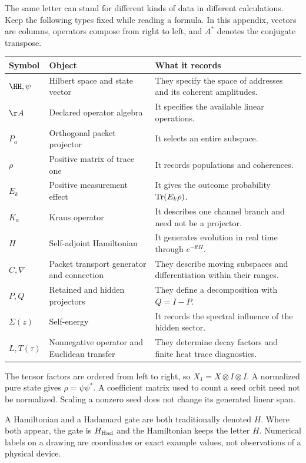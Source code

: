 The same letter can stand for different kinds of data in different calculations. Keep the following types fixed while reading a formula. In this appendix, vectors are columns, operators compose from right to left, and $A^*$ denotes the conjugate transpose.
\par\vspace{4pt}
\begin{tabularx}{\linewidth}{@{}p{.13\linewidth}YY@{}}
\toprule
Symbol & Object & What it records\\\midrule
$\HH,\psi$ & Hilbert space and state vector & They specify the space of addresses and its coherent amplitudes.\\
$\AA$ & Declared operator algebra & It specifies the available linear operations.\\
$P_a$ & Orthogonal packet projector & It selects an entire subspace.\\
$\rho$ & Positive matrix of trace one & It records populations and coherences.\\
$E_k$ & Positive measurement effect & It gives the outcome probability $\operatorname{Tr}(E_k\rho)$.\\
$K_a$ & Kraus operator & It describes one channel branch and need not be a projector.\\
$H$ & Self-adjoint Hamiltonian & It generates evolution in real time through $e^{-\ii tH}$.\\
$C,\nabla$ & Packet transport generator and connection & They describe moving subspaces and differentiation within their ranges.\\
$P,Q$ & Retained and hidden projectors & They define a decomposition with $Q=I-P$.\\
$\Sigma(z)$ & Self-energy & It records the spectral influence of the hidden sector.\\
$L,T(\tau)$ & Nonnegative operator and Euclidean transfer & They determine decay factors and finite heat trace diagnostics.\\\bottomrule
\end{tabularx}
The tensor factors are ordered from left to right, so $X_1=X\otimes I\otimes I$. A normalized pure state gives $\rho=\psi\psi^*$. A coefficient matrix used to count a seed orbit need not be normalized. Scaling a nonzero seed does not change its generated linear span.

A Hamiltonian and a Hadamard gate are both traditionally denoted $H$. Where both appear, the gate is $H_{\rm Had}$ and the Hamiltonian keeps the letter $H$. Numerical labels on a drawing are coordinates or exact example values, not observations of a physical device.

